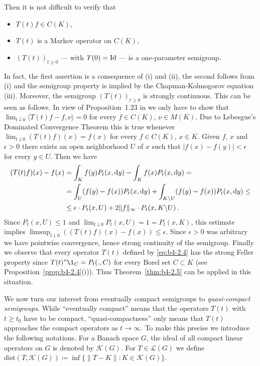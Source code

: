 \begin{example}
	Then it is not difficult to verify that 
    \begin{itemize}[-] 
        \item 
        $T(t)f \in C(K)$, 
        \item 
        $T(t)$ is a Markov operator on $C(K)$, 
        \item 
        $(T(t))_{t \geq 0}$ --- with $T(0) = \operatorname{Id} $ --- is a one-parameter semigroup.
    \end{itemize}
	In fact, the first assertion is a consequence of (i) and (ii), the second follows from (i) and the semigroup property is implied by the Chapman-Kolmogorov equation (iii).
%
%
Moreover, the semigroup $(T(t))_{t \geq 0}$ is strongly continuous.
This can be seen as follows. 
In view of Proposition~1.23 in \citet{davies:1980} we only have
to show that $\lim_{t\downarrow 0}\langle T(t)f-f,\nu\rangle = 0$ for every $f \in C(K)$, $\nu \in M(K)$.
Due to Lebesgue's Dominated Convergence Theorem this is true whenever
$\lim_{t\downarrow0}(T(t)f)(x) = f(x)$ for every $f \in C(K)$, $x \in K$.
Given $f$, $x$
and $\epsilon > 0$ there exists an open neighborhood $U$ of $x$ such that
$|f(x) - f(y)| < \epsilon$ for every $y \in U$.
Then we have
\[
    \begin{aligned} 
    (T(t)f)(x) - f(x) &= \int_K f(y)P_t(x,\mathop{}\!\mathrm{d}{y}) - \int_K f(x)P_t(x,\mathop{}\!\mathrm{d}{y}) = \\
    &= \int_U (f(y)-f(x))P_t(x,\mathop{}\!\mathrm{d}{y}) + \int_{K\backslash U} (f(y)-f(x))P_t(x,\mathop{}\!\mathrm{d}{y}) \leq \\
    &\leq \epsilon\cdot P_t(x,U) + 2\|f\|_{\infty}\cdot P_t(x,K\backslash U)\,.
    \end{aligned}
\]
Since $P_t(x,U) \leq 1$ and $\lim_{t\downarrow0} P_t(x,U) = 1 = P_t(x,K)$, this estimate
implies $\limsup_{t\downarrow0}((T(t)f)(x) - f(x)) \leq \epsilon$.
Since $\epsilon > 0$ was arbitrary we have pointwise convergence, hence strong continuity of the semigroup.
Finally we observe that every operator $T(t)$ defined by \eqref{eq:b4-2.4} has the
strong Feller property since $T(t)"\1_C = P_t(.,C)$ for every Borel set
$C \subset K$ (see Proposition~\ref{prop:b4-2.4}(i)).
Thus Theorem~\ref{thm:b4-2.5} can be applied in this situation.
\end{example}

We now turn our interest from eventually compact semigroups to \emph{quasi-compact semigroups}.
While \enquote{eventually compact} means that the operators $T(t)$ with $t \geq t_{0}$ have to be compact, \enquote{quasi-compactness} only
means that $T(t)$ approaches the compact operators as $t \to \infty$.
To make this precise we introduce the following notations.
For a Banach space $G$, the ideal of all compact linear operators on $G$ is denoted by $\mathcal{K}(G)$.
For $T \in \mathcal{L}(G)$ we define
$\text{dist}(T,\mathcal{K}(G))  \coloneq  \inf\{\|T - K\| \colon K \in \mathcal{K}(G)\}$.

